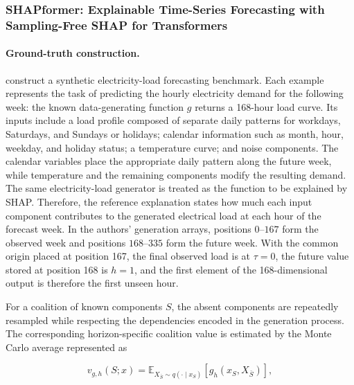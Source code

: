 \subsubsection{SHAPformer: Explainable Time-Series Forecasting with Sampling-Free SHAP for Transformers}

\paragraph{Ground-truth construction.}
\citet{hertel2026shapformer} construct a synthetic electricity-load forecasting
benchmark. Each example represents the task of predicting the hourly
electricity demand for the following week: the known data-generating function
$g$ returns a 168-hour load curve. Its inputs include a load profile composed
of separate daily patterns for workdays, Saturdays, and Sundays or holidays;
calendar information such as month, hour, weekday, and holiday status; a
temperature curve; and noise components. The calendar variables place the
appropriate daily pattern along the future week, while temperature and the
remaining components modify the resulting demand. The same electricity-load
generator is treated as the function to be explained by SHAP. Therefore, the
reference explanation states how much each input component contributes to the
generated electrical load at each hour of the forecast week. In the authors'
generation arrays, positions $0$--$167$ form the observed week and positions
$168$--$335$ form the future week. With the common origin placed at position
167, the final observed load is at $\tau=0$, the future value stored at
position 168 is $h=1$, and the first element of the 168-dimensional output is
therefore the first unseen hour.

For a coalition of known components $S$, the absent components are repeatedly
resampled while respecting the dependencies encoded in the generation process.
The corresponding horizon-specific coalition value is estimated by the
Monte Carlo average represented as

\begin{equation}
    v_{g,h}(S;x)
    =
    \mathbb{E}_{X_{\bar S}\sim q(\cdot\mid x_S)}
    \!\left[g_h\!\left(x_S,X_{\bar S}\right)\right],
\end{equation}


